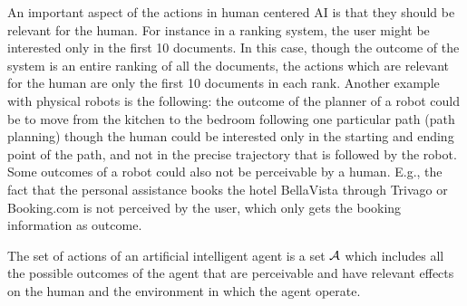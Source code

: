 An important aspect of the actions in human centered AI is that they
should be relevant for the human. 
%
%
For instance in a ranking system,
the user might be interested only in the first 10 documents. In this
case, though the outcome of the system is an entire ranking of all the
documents, the actions which are relevant for the human are only the
first 10 documents in each rank. Another example with physical robots
is the following: the outcome of the planner of a robot could be to
move from the kitchen to the bedroom following one particular path
(path planning) though the human could be interested only in the
starting and ending point of the path, and not in the precise
trajectory that is followed by the robot. Some outcomes of a robot
could also not be perceivable by a human. E.g., the fact that the
personal assistance books the hotel BellaVista through Trivago or
Booking.com is not perceived by the user, which only gets the booking
information as outcome.

\begin{definition}
  The set of actions of an artificial intelligent agent is a set
  $\mathcal{A}$ which includes all the possible outcomes of the 
  agent that are perceivable and have relevant effects on the human and the
  environment in which the agent operate.
\end{definition}


